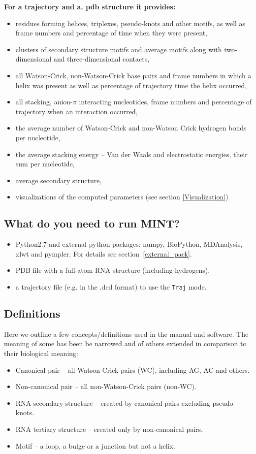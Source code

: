 \documentclass[12pt]{article}
\begin{document}
\textbf{For a trajectory and a. pdb structure it provides:}
\begin{itemize}
\item residues forming helices, triplexes, pseudo-knots and other motifs, as well as frame numbers and percentage of time when they were present, 
\item clusters of secondary structure motifs and average motifs along with two-dimensional and three-dimensional contacts,
\item all Watson-Crick, non-Watson-Crick base pairs and frame numbers in which a helix was present as well as percentage of trajectory time the helix occurred,
\item all stacking, anion-$\pi$ interacting nucleotides, frame numbers and percentage of trajectory when an interaction occurred,
\item the average number of Watson-Crick and non-Watson Crick hydrogen bonds per nucleotide,
\item the average stacking energy -- Van der Waals and electrostatic energies, their sum per nucleotide,
\item average secondary structure,
\item visualizations of the computed parameters (see section \ref{Visualization})
\end{itemize}


\subsection{What do you need to run MINT?}
\begin{itemize}
\item Python2.7 and external python packages: numpy, BioPython, MDAnalysis, xlwt and pympler.
For details see section~\ref{external_pack}.
\item PDB file with a full-atom RNA structure (including hydrogens).
\item a trajectory file (e.g. in the .dcd format) to use the \texttt{Traj} mode.
\end{itemize}

\subsection{Definitions}
Here we outline a few concepts/definitions used in the manual and software. The meaning of some has been be narrowed and of others extended in comparison to their biological meaning: 
\begin{itemize} 
\item Canonical pair -- all Watson-Crick pairs (WC), including AG, AC and others.
\item Non-canonical pair -- all non-Watson-Crick pairs (non-WC).
\item RNA secondary structure -- created by canonical pairs excluding pseudo-knots.
\item RNA tertiary structure -- created only by non-canonical pairs.
\item Motif -- a loop, a bulge or a junction but not a helix. 
\end{itemize}
\end{document}
